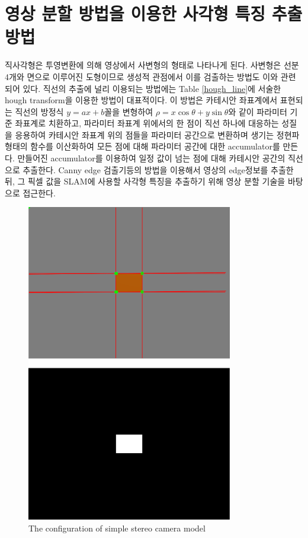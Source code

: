 \documentclass[master,korean,final]{cbnu-ecs}
\begin{document}
\chapter{영상 분할 방법을 이용한 사각형 특징 추출 방법}
직사각형은 투영변환에 의해 영상에서 사변형의 형태로 나타나게 된다. 사변형은 선분 4개와 면으로 이루어진 도형이므로 생성적 관점에서 이를 검출하는 방법도 이와 관련되어 있다. 직선의 추출에 널리 이용되는 방법에는 Table \ref{hough_line}에 서술한 hough transform을 이용한 방법이 대표적이다. 이 방법은 카테시안 좌표계에서 표현되는 직선의 방정식 $y=ax+b$꼴을 변형하여 $\rho=x\cos\theta+y\sin\theta$와 같이 파라미터 기준 좌표계로 치환하고, 파라미터 좌표계 위에서의 한 점이 직선 하나에 대응하는 성질을 응용하여 카테시안 좌표계 위의 점들을 파라미터 공간으로 변환하며 생기는 정현파 형태의 함수를 이산화하여 모든 점에 대해 파라미터 공간에 대한 accumulator를 만든다. 만들어진 accumulator를 이용하여 일정 값이 넘는 점에 대해 카테시안 공간의 직선으로 추출한다.
Canny edge 검출기등의 방법을 이용해서 영상의 edge정보를 추출한 뒤, 그 픽셀 값을 
SLAM에 사용할 사각형 특징을 추출하기 위해 영상 분할 기술을 바탕으로 접근한다. 
\begin{figure}[!ht]
  \centering
	\includegraphics[width=340px]{img/rect_hough01.png}
  \caption{The configuration of simple stereo camera model}
\label{rect_hough01}
\end{figure}
\end{document}
